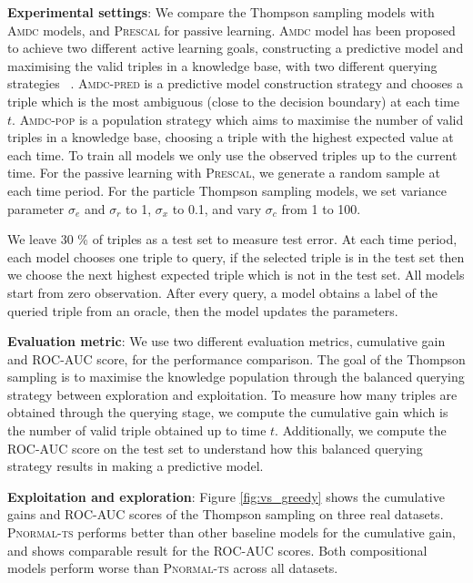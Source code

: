%

\textbf{Experimental settings}:
We compare the Thompson sampling models with \textsc{Amdc} models, and \textsc{Prescal} for passive learning.
\textsc{Amdc} model has been proposed to achieve two different active learning goals, constructing a predictive
model and maximising the valid triples in a knowledge base, with two different querying strategies
~\cite{kajino2015active}.
\textsc{Amdc-pred} is a predictive model construction strategy and chooses a triple which is the most ambiguous (close to the decision boundary) at each time $t$.
\textsc{Amdc-pop} is a population strategy which aims to maximise the number of valid triples in a knowledge base, choosing a triple with the highest expected value at each time.
To train all models we only use the observed triples up to the current time.
For the passive learning with \textsc{Prescal}, we generate a random sample at each time period.
For the particle Thompson sampling models, we set variance parameter $\sigma_e$ and $\sigma_r$ to 1, $\sigma_x$ to 0.1, and vary $\sigma_c$ from 1 to 100.

We leave 30 \% of triples as a test set to measure test error.
At each time period, each model chooses one triple to query,
if the selected triple is in the test set then we choose the next highest expected triple which is not in the test set.
All models start from zero observation.
After every query, a model obtains a label of the queried triple from an oracle,
then the model updates the parameters.

\textbf{Evaluation metric}: We use two different evaluation metrics, cumulative gain and ROC-AUC score,
for the performance comparison. The goal of the Thompson sampling is to maximise the knowledge
population through the balanced querying strategy between exploration and exploitation.
To measure how many triples are obtained through the querying stage, we compute the cumulative
gain which is the number of valid triple obtained up to time $t$. Additionally, we compute the ROC-AUC score on
the test set to understand how this balanced querying strategy results in making a predictive model.

\textbf{Exploitation and exploration}:
Figure \ref{fig:vs_greedy} shows
the cumulative gains and ROC-AUC scores of the Thompson sampling on three real datasets.
\textsc{Pnormal-ts} performs better than other baseline models for the cumulative gain, and shows comparable result for the ROC-AUC scores. Both compositional models perform worse than \textsc{Pnormal-ts} across all datasets.

